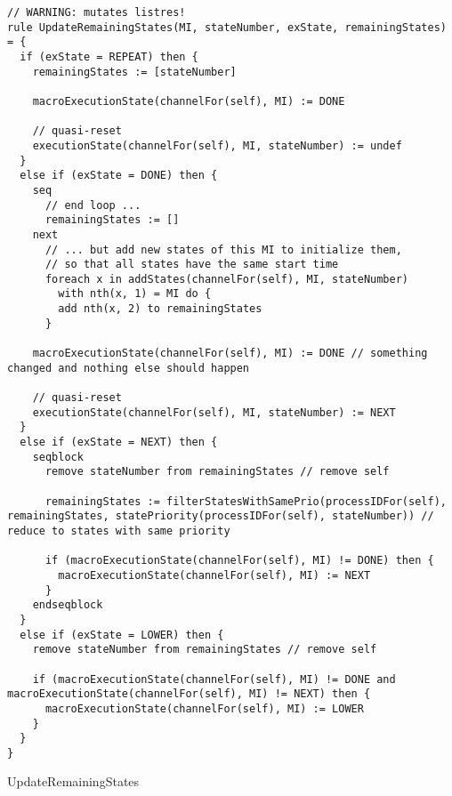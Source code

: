\begin{listing}[H]
\begin{verbatim}
// WARNING: mutates listres!
rule UpdateRemainingStates(MI, stateNumber, exState, remainingStates) = {
  if (exState = REPEAT) then {
    remainingStates := [stateNumber]

    macroExecutionState(channelFor(self), MI) := DONE

    // quasi-reset
    executionState(channelFor(self), MI, stateNumber) := undef
  }
  else if (exState = DONE) then {
    seq
      // end loop ...
      remainingStates := []
    next
      // ... but add new states of this MI to initialize them,
      // so that all states have the same start time
      foreach x in addStates(channelFor(self), MI, stateNumber)
        with nth(x, 1) = MI do {
        add nth(x, 2) to remainingStates
      }

    macroExecutionState(channelFor(self), MI) := DONE // something changed and nothing else should happen

    // quasi-reset
    executionState(channelFor(self), MI, stateNumber) := NEXT
  }
  else if (exState = NEXT) then {
    seqblock
      remove stateNumber from remainingStates // remove self

      remainingStates := filterStatesWithSamePrio(processIDFor(self), remainingStates, statePriority(processIDFor(self), stateNumber)) // reduce to states with same priority

      if (macroExecutionState(channelFor(self), MI) != DONE) then {
        macroExecutionState(channelFor(self), MI) := NEXT
      }
    endseqblock
  }
  else if (exState = LOWER) then {
    remove stateNumber from remainingStates // remove self

    if (macroExecutionState(channelFor(self), MI) != DONE and macroExecutionState(channelFor(self), MI) != NEXT) then {
      macroExecutionState(channelFor(self), MI) := LOWER
    }
  }
}
\end{verbatim}
\caption{UpdateRemainingStates}
\label{lst:asm:UpdateRemainingStates}
\end{listing}




